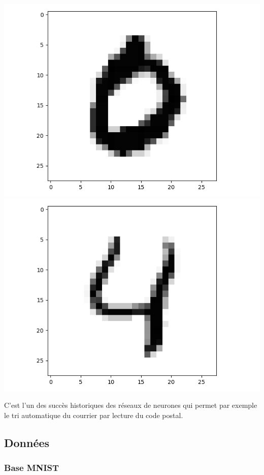 \documentclass[11pt,class=report,crop=false]{standalone}
\begin{document}
\begin{center}
\includegraphics[scale=\myscale,scale=0.20]{figures/tf2-chiffre-test-3}
\includegraphics[scale=\myscale,scale=0.20]{figures/tf2-chiffre-test-4}
\end{center}
C'est l'un des succès historiques des réseaux de neurones qui permet par exemple le tri automatique du courrier par lecture du code postal.

\subsection{Données}


\subsubsection*{Base MNIST}
\end{document}
